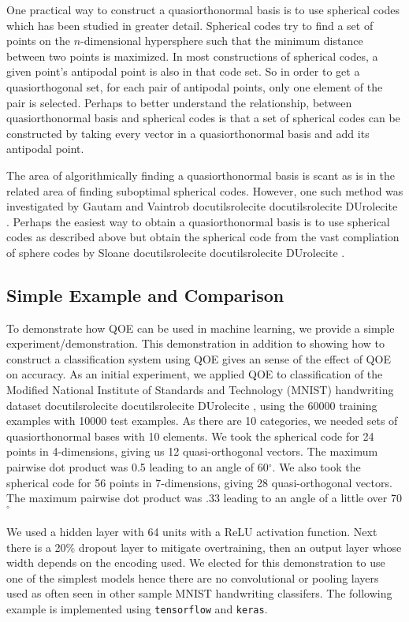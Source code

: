 \documentclass[]{article}
\providecommand*{\DUrole}[2]{%
  \ifcsname docutilsrole#1\endcsname%
    \csname docutilsrole#1\endcsname{#2}%
  \else
    \csname DUrole#1\endcsname{#2}%
  \fi%
}
\begin{document}
One practical way to construct a quasiorthonormal basis is to use spherical codes which has been studied in greater detail. Spherical codes try to find a set of points on the $n$-dimensional hypersphere
such that the minimum distance between two points is maximized. In most
constructions of spherical codes, a given point's antipodal point is
also in that code set. So in order to get a quasiorthogonal set, for
each pair of antipodal points, only one element of the pair is selected. Perhaps to better understand the relationship, between quasiorthonormal basis and spherical codes is that a set of spherical codes can be constructed by taking every vector in a quasiorthonormal basis and add its antipodal point.

The area of algorithmically finding a quasiorthonormal basis is scant as is in the related area of finding suboptimal spherical codes. However, one such method was investigated by Gautam and Vaintrob \DUrole{cite}{Gautam2013ANA}. Perhaps the easiest way to obtain a quasiorthonormal basis is to use spherical codes as described above but obtain the spherical code from the vast compliation of sphere codes by Sloane \DUrole{cite}{sphere}.

\subsection{Simple Example and Comparison%
  \label{simple-example-and-comparison}%
}


To demonstrate how QOE can be used in machine learning, we provide a simple experiment/demonstration.
This demonstration in addition to showing how to construct a classification system using QOE gives an sense of the effect of QOE on accuracy. As an initial experiment, we applied QOE to classification of the Modified National Institute of Standards and Technology (MNIST) handwriting dataset \DUrole{cite}{mnist}, using the 60000 training examples with 10000 test
examples. As there are 10 categories, we needed sets of quasiorthonormal
bases with 10 elements. We took the spherical code for 24 points in
4-dimensions, giving us 12 quasi-orthogonal vectors. The maximum
pairwise dot product was 0.5 leading to an angle of 60$^\circ$.
We also took the spherical code for 56 points in 7-dimensions, giving 28
quasi-orthogonal vectors. The maximum pairwise dot product was .33
leading to an angle of a little over 70$^\circ$

We used a hidden layer with 64 units with a ReLU activation function.
Next there is a 20\% dropout layer to mitigate overtraining, then an
output layer whose width depends on the encoding used. We elected for this demonstration to use one of the simplest models hence there are no convolutional or pooling layers used as often seen in other sample MNIST handwriting classifers. The following example is implemented using \texttt{tensorflow} and \texttt{keras}.
\end{document}
